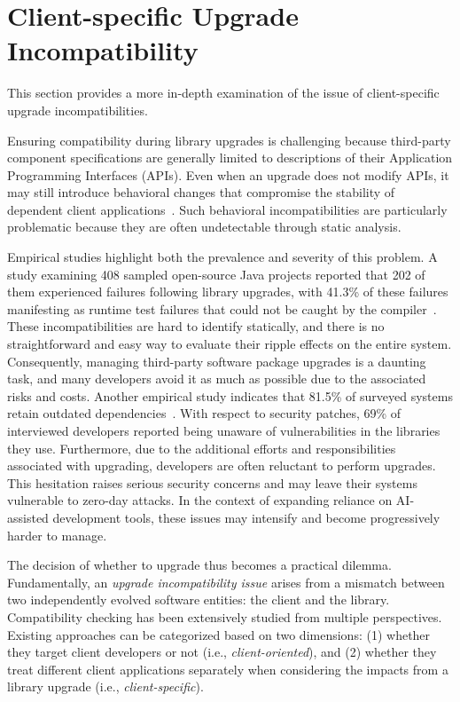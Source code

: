 \section{Client-specific Upgrade Incompatibility}
This section provides a more in-depth examination of the issue of client-specific upgrade incompatibilities.

Ensuring compatibility during library upgrades is challenging because third-party component specifications are generally limited to descriptions of their Application Programming Interfaces (APIs). Even when an upgrade does not modify APIs, it may still introduce behavioral changes that compromise the stability of dependent client applications~\cite{rubin2016challenges}. Such behavioral incompatibilities are particularly problematic because they are often undetectable through static analysis.

Empirical studies highlight both the prevalence and severity of this problem. A study examining 408 sampled open-source Java projects reported that 202 of them experienced failures following library upgrades, with 41.3\% of these failures manifesting as runtime test failures that could not be caught by the compiler~\cite{gyori2018evaluating}. These incompatibilities are hard to identify statically, and there is no straightforward and easy way to evaluate their ripple effects on the entire system. Consequently, managing third-party software package upgrades is a daunting task, and many developers avoid it as much as possible due to the associated risks and costs. Another empirical study indicates that 81.5\% of surveyed systems retain outdated dependencies~\cite{kula2018developers}. With respect to security patches, 69\% of interviewed developers reported being unaware of vulnerabilities in the libraries they use. Furthermore, due to the additional efforts and responsibilities associated with upgrading, developers are often reluctant to perform upgrades. This hesitation raises serious security concerns and may leave their systems vulnerable to zero-day attacks. In the context of expanding reliance on AI-assisted development tools, these issues may intensify and become progressively harder to manage.

The decision of whether to upgrade thus becomes a practical dilemma. Fundamentally, an \emph{upgrade incompatibility issue} arises from a mismatch between two independently evolved software entities: the client and the library. Compatibility checking has been extensively studied from multiple perspectives. Existing approaches can be categorized based on two dimensions: (1) whether they target client developers or not (i.e., \emph{client-oriented}), and (2) whether they treat different client applications separately when considering the impacts from a library upgrade (i.e., \emph{client-specific}).

